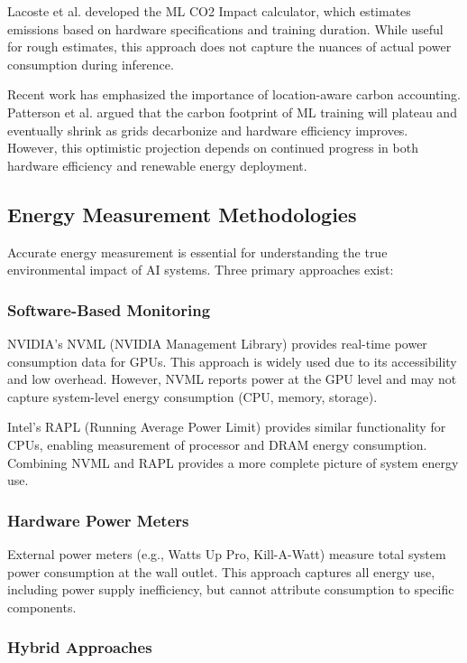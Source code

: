 \documentclass[11pt]{article}
\begin{document}
Lacoste et al. \cite{lacoste2019quantifying} developed the ML CO2 Impact calculator, which estimates emissions based on hardware specifications and training duration. While useful for rough estimates, this approach does not capture the nuances of actual power consumption during inference.

Recent work has emphasized the importance of location-aware carbon accounting. Patterson et al. \cite{patterson2022carbon} argued that the carbon footprint of ML training will plateau and eventually shrink as grids decarbonize and hardware efficiency improves. However, this optimistic projection depends on continued progress in both hardware efficiency and renewable energy deployment.

\subsection{Energy Measurement Methodologies}

Accurate energy measurement is essential for understanding the true environmental impact of AI systems. Three primary approaches exist:

\subsubsection{Software-Based Monitoring}

NVIDIA's NVML (NVIDIA Management Library) provides real-time power consumption data for GPUs. This approach is widely used due to its accessibility and low overhead. However, NVML reports power at the GPU level and may not capture system-level energy consumption (CPU, memory, storage).

Intel's RAPL (Running Average Power Limit) provides similar functionality for CPUs, enabling measurement of processor and DRAM energy consumption. Combining NVML and RAPL provides a more complete picture of system energy use.

\subsubsection{Hardware Power Meters}

External power meters (e.g., Watts Up Pro, Kill-A-Watt) measure total system power consumption at the wall outlet. This approach captures all energy use, including power supply inefficiency, but cannot attribute consumption to specific components.

\subsubsection{Hybrid Approaches}
\end{document}
